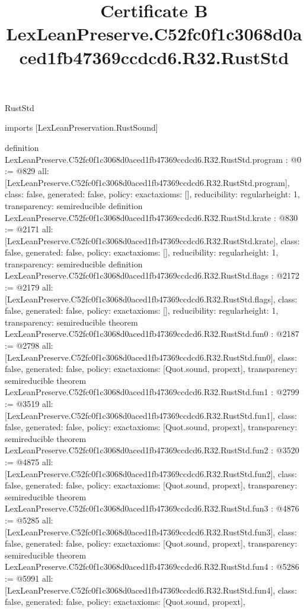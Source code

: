 \begin{lexlean}{RustStd}
\title{Certificate B LexLeanPreserve.C52fc0f1c3068d0aced1fb47369ccdcd6.R32.RustStd}
\begin{coremodule}
imports [LexLeanPreservation.RustSound]

definition LexLeanPreserve.C52fc0f1c3068d0aced1fb47369ccdcd6.R32.RustStd.program : @0 := @829 {
  all: [LexLeanPreserve.C52fc0f1c3068d0aced1fb47369ccdcd6.R32.RustStd.program],
  class: false,
  generated: false,
  policy: exact{axioms: []},
  reducibility: regular{height: 1},
  transparency: semireducible
}
definition LexLeanPreserve.C52fc0f1c3068d0aced1fb47369ccdcd6.R32.RustStd.krate : @830 := @2171 {
  all: [LexLeanPreserve.C52fc0f1c3068d0aced1fb47369ccdcd6.R32.RustStd.krate],
  class: false,
  generated: false,
  policy: exact{axioms: []},
  reducibility: regular{height: 1},
  transparency: semireducible
}
definition LexLeanPreserve.C52fc0f1c3068d0aced1fb47369ccdcd6.R32.RustStd.flags : @2172 := @2179 {
  all: [LexLeanPreserve.C52fc0f1c3068d0aced1fb47369ccdcd6.R32.RustStd.flags],
  class: false,
  generated: false,
  policy: exact{axioms: []},
  reducibility: regular{height: 1},
  transparency: semireducible
}
theorem LexLeanPreserve.C52fc0f1c3068d0aced1fb47369ccdcd6.R32.RustStd.fun0 : @2187 := @2798 {
  all: [LexLeanPreserve.C52fc0f1c3068d0aced1fb47369ccdcd6.R32.RustStd.fun0],
  class: false,
  generated: false,
  policy: exact{axioms: [Quot.sound, propext]},
  transparency: semireducible
}
theorem LexLeanPreserve.C52fc0f1c3068d0aced1fb47369ccdcd6.R32.RustStd.fun1 : @2799 := @3519 {
  all: [LexLeanPreserve.C52fc0f1c3068d0aced1fb47369ccdcd6.R32.RustStd.fun1],
  class: false,
  generated: false,
  policy: exact{axioms: [Quot.sound, propext]},
  transparency: semireducible
}
theorem LexLeanPreserve.C52fc0f1c3068d0aced1fb47369ccdcd6.R32.RustStd.fun2 : @3520 := @4875 {
  all: [LexLeanPreserve.C52fc0f1c3068d0aced1fb47369ccdcd6.R32.RustStd.fun2],
  class: false,
  generated: false,
  policy: exact{axioms: [Quot.sound, propext]},
  transparency: semireducible
}
theorem LexLeanPreserve.C52fc0f1c3068d0aced1fb47369ccdcd6.R32.RustStd.fun3 : @4876 := @5285 {
  all: [LexLeanPreserve.C52fc0f1c3068d0aced1fb47369ccdcd6.R32.RustStd.fun3],
  class: false,
  generated: false,
  policy: exact{axioms: [Quot.sound, propext]},
  transparency: semireducible
}
theorem LexLeanPreserve.C52fc0f1c3068d0aced1fb47369ccdcd6.R32.RustStd.fun4 : @5286 := @5991 {
  all: [LexLeanPreserve.C52fc0f1c3068d0aced1fb47369ccdcd6.R32.RustStd.fun4],
  class: false,
  generated: false,
  policy: exact{axioms: [Quot.sound, propext]},
}
\end{coremodule}
\end{lexlean}
